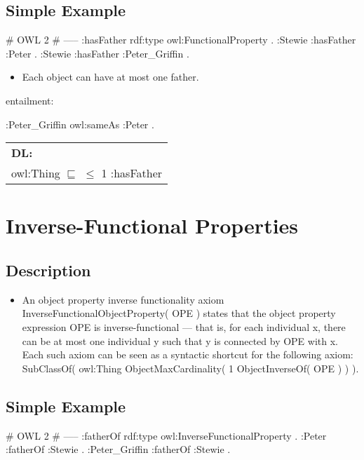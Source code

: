 \documentclass{llncs}
\newenvironment{DL}{
  \scriptsize
  \sffamily
  \vspace{0.3cm}
  \begin{tabular}{l}
	\textbf{DL:} \\

}{
  \end{tabular}
  \linebreak
}
\begin{document}
\subsection{Simple Example}

\begin{ex}
# OWL 2
# -----
:hasFather rdf:type owl:FunctionalProperty . 	
:Stewie :hasFather :Peter . 	
:Stewie :hasFather :Peter_Griffin . 
\end{ex}

\begin{itemize}
	\item Each object can have at most one father. 
\end{itemize}

entailment:

\begin{ex}
:Peter_Griffin owl:sameAs :Peter .  
\end{ex}

\begin{DL}
owl:Thing $\sqsubseteq$ $\leq$ 1 :hasFather
\end{DL}

\section{Inverse-Functional Properties}

\subsection{Description}

\begin{itemize}
	\item An object property inverse functionality axiom InverseFunctionalObjectProperty( OPE ) states that the object property expression OPE is inverse-functional — that is, for each individual x, there can be at most one individual y such that y is connected by OPE with x. Each such axiom can be seen as a syntactic shortcut for the following axiom: SubClassOf( owl:Thing ObjectMaxCardinality( 1 ObjectInverseOf( OPE ) ) ).
\end{itemize}

\subsection{Simple Example}

\begin{ex}
# OWL 2
# -----
:fatherOf rdf:type owl:InverseFunctionalProperty . 	
:Peter :fatherOf :Stewie .
:Peter_Griffin :fatherOf :Stewie .
\end{ex}
\end{document}
